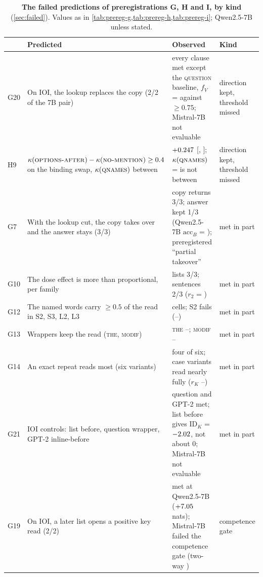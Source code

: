 \begin{table}[p]
\centering
\footnotesize
\caption{\textbf{The \GHIcountFailed{} failed predictions of preregistrations G, H and I, by kind} (\cref{sec:failed}). Values as in \cref{tab:prereg-g,tab:prereg-h,tab:prereg-i}; Qwen2.5-7B unless stated.}
\label{tab:failures}
\begin{tabular}{@{}l p{} p{} p{}@{}}
\toprule
& Predicted & Observed & Kind \\
\midrule
G20 & On IOI, the lookup replaces the copy (2/2 of the 7B pair) & every clause met except the \textsc{question} baseline, $f_V$ = \GeFVQuestionQwenSeven{} against $\geq 0.75$; Mistral-7B not evaluable & direction kept, threshold missed \\
H9 & $\kappa(\text{\textsc{options-after}{}}) - \kappa(\text{\textsc{no-mention}{}}) \geq 0.4$ on the binding swap, $\kappa(\textsc{qnames})$ between & $+0.247{}$ [\HnineDiffLo{}, \HnineDiffHi{}]; $\kappa(\textsc{qnames})$ = \PkKappaBindQnames{} is not between & direction kept, threshold missed \\
\midrule
G7 & With the lookup cut, the copy takes over and the answer stays (3/3) & copy returns 3/3; answer kept 1/3 (Qwen2.5-7B $\mathrm{acc}_B$ = \GsevenAccBAfterQwenSeven{}); preregistered ``partial takeover'' & met in part \\
G10 & The dose effect is more than proportional, per family & lists 3/3; sentences 2/3 ($r_2$ = \GtenSRtwoQwenSeven{}) & met in part \\
G12 & The named words carry $\geq 0.5$ of the read in S2, S3, L2, L3 & \GtwelveCells{} cells; S2 fails (\GtwelveStwoQwenFourteen{}--\GtwelveStwoQwenSeven{}) & met in part \\
G13 & Wrappers keep the read (\textsc{the}, \textsc{modif}) & \textsc{the} \GthirteenTheMin{}--\GthirteenTheMax{}; \textsc{modif} \GthirteenModifMin{}--\GthirteenModifMax{} & met in part \\
G14 & An exact repeat reads most (six variants) & four of six; case variants read nearly fully ($r_K$ \GfourteenCaseMin{}--\GfourteenCaseMax{}) & met in part \\
G21 & IOI controls: list before, question wrapper, GPT-2 inline-before & question and GPT-2 met; list before gives $\mathrm{ID}_K$ = $-2.02{}$, not about 0; Mistral-7B not evaluable & met in part \\
\midrule
G19 & On IOI, a later list opens a positive key read (2/2) & met at Qwen2.5-7B ($+7.05{}$ nats); Mistral-7B failed the competence gate (two-way \GeTwowayAfterMistralSeven{}) & competence gate \\

\end{tabular}
\end{table}
